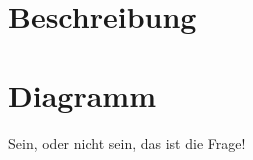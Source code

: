 \section{Beschreibung}
\label{section:Beschreibung}

\section{Diagramm}
\label{section:Diagramm}

Sein, oder nicht sein, das ist die Frage!
